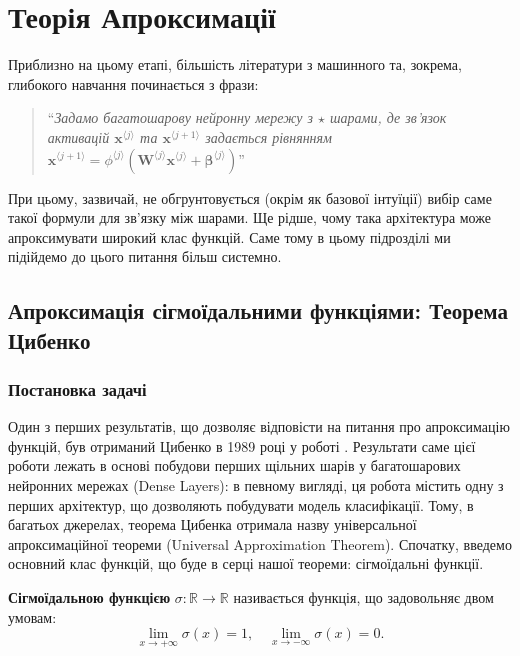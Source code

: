 \chapter{Теорія Апроксимації}

Приблизно на цьому етапі, більшість літератури з машинного та, зокрема,
глибокого навчання починається з фрази:

\begin{quote}
    \begin{center}
    ``\textit{Задамо багатошарову нейронну мережу з $\star$ шарами, де зв'язок
    активацій $\mathbf{x}^{\langle j \rangle}$ та $\mathbf{x}^{\langle j+1
    \rangle}$ задається рівнянням $\mathbf{x}^{\langle j+1 \rangle} =
    \phi^{\langle j \rangle}(\boldsymbol{W}^{\langle j
    \rangle}\mathbf{x}^{\langle j \rangle}+\boldsymbol{\beta}^{\langle j \rangle})$}''
    \end{center}
\end{quote}

При цьому, зазвичай, не обгрунтовується (окрім як базової інтуїції) вибір
саме такої формули для зв'язку між шарами. Ще рідше, чому така архітектура
може апроксимувати широкий клас функцій. Саме тому в цьому підрозділі
ми підійдемо до цього питання більш системно.

\section{Апроксимація сігмоїдальними функціями: Теорема Цибенко}

\subsection{Постановка задачі}
Один з перших результатів, що дозволяє відповісти на питання про апроксимацію
функцій, був отриманий Цибенко в 1989 році у роботі \cite{cybenko}. Результати
саме цієї роботи лежать в основі побудови перших щільних шарів у багатошарових
нейронних мережах (Dense Layers): в певному вигляді, ця робота містить одну з
перших архітектур, що дозволяють побудувати модель класифікації. Тому, в
багатьох джерелах, теорема Цибенка отримала назву універсальної апроксимаційної
теореми (Universal Approximation Theorem). Спочатку, введемо основний клас
функцій, що буде в серці нашої теореми: сігмоїдальні функції.

\begin{definition}
	\textbf{Сігмоїдальною функцією} $\sigma: \mathbb{R} \to \mathbb{R}$ називається
	функція, що задовольняє двом умовам:
	\begin{equation}
		\lim_{x \to +\infty} \sigma(x) = 1, \quad \lim_{x \to -\infty}\sigma(x) = 0.
	\end{equation}
\end{definition}

